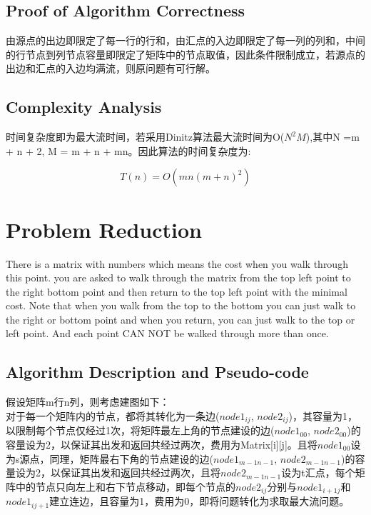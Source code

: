 \documentclass{article}
\begin{document}
\begin{CJK*}{UTF8}{gbsn}
\subsection{Proof of Algorithm Correctness}
由源点的出边即限定了每一行的行和，由汇点的入边即限定了每一列的列和，中间的行节点到列节点容量即限定了矩阵中的节点取值，因此条件限制成立，若源点的出边和汇点的入边均满流，则原问题有可行解。

\subsection{Complexity Analysis}
时间复杂度即为最大流时间，若采用Dinitz算法最大流时间为O($N^2M$),其中N =m + n + 2, M = m + n + mn。因此算法的时间复杂度为: 

\begin{equation}
T(n) = O(mn(m + n)^2)
\end{equation}

\newpage
\section{Problem Reduction}
There is a matrix with numbers which means the cost when you walk through this point. you are asked to walk through the matrix from the top left point to the right bottom point and then return to the top left point with the minimal cost. Note that when you walk from the top to the bottom you can just walk to the right or bottom point and when you return, you can just walk to the top or left point. And each point CAN NOT be walked through more than once.



\subsection{Algorithm Description and Pseudo-code}
假设矩阵m行n列，则考虑建图如下：\\

对于每一个矩阵内的节点，都将其转化为一条边($node1_{ij}$, $node2_{ij}$)，其容量为1，以限制每个节点仅经过1次，将矩阵最左上角的节点建设的边($node1_{00}$, $node2_{00}$)的容量设为2，以保证其出发和返回共经过两次，费用为Matrix[i][j]。且将$node1_{00}$设为s源点，同理，矩阵最右下角的节点建设的边($node1_{m-1n-1}$, $node2_{m-1n-1}$)的容量设为2，以保证其出发和返回共经过两次，且将$node2_{m-1n-1}$设为t汇点，每个矩阵中的节点只向左上和右下节点移动，即每个节点的$node2_{ij}$分别与$node1_{i+1j}$和$node1_{ij+1}$建立连边，且容量为1，费用为0，即将问题转化为求取最大流问题。


\end{CJK*}
\end{document}
